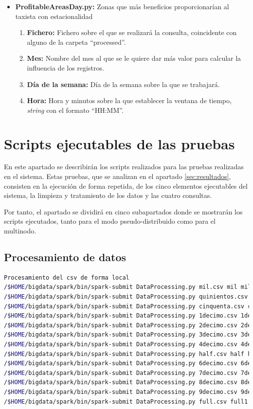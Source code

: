 \begin{itemize}
\item \textbf{ProfitableAreasDay.py:} Zonas que más beneficios proporcionarían al taxista con estacionalidad
\begin{enumerate}
\item \textbf{Fichero:} Fichero sobre el que se realizará la consulta, coincidente con alguno de la carpeta ``processed''.
\item \textbf{Mes:} Nombre del mes al que se le quiere dar más valor para calcular la influencia de los registros.
\item \textbf{Día de la semana:} Día de la semana sobre la que se trabajará.
\item \textbf{Hora:} Hora y minutos sobre la que establecer la ventana de tiempo, \textit{string} con el formato ``HH:MM''.
\end{enumerate}
\end{itemize}

\section{Scripts ejecutables de las pruebas}
En este apartado se describirán los scripts realizados para las pruebas realizadas en el sistema. Estas pruebas, que se analizan en el apartado \ref{sec:resultados}, consisten en la ejecución de forma repetida, de los cinco elementos ejecutables del sistema, la limpieza y tratamiento de los datos y las cuatro consultas.

Por tanto, el apartado se dividirá en cinco subapartados donde se mostrarán los scripts ejecutados, tanto para el modo pseudo-distribuido como para el multinodo.

\subsection{Procesamiento de datos}

\begin{lstlisting}[label=sproc,language=sh,frame=single,caption=Script procesamiento de datos en modo pseudo-distribuido]
 Procesamiento del csv de forma local
/$HOME/bigdata/spark/bin/spark-submit DataProcessing.py mil.csv mil mil
/$HOME/bigdata/spark/bin/spark-submit DataProcessing.py quinientos.csv quinientos quinientos
/$HOME/bigdata/spark/bin/spark-submit DataProcessing.py cinquenta.csv cinquenta cinquenta
/$HOME/bigdata/spark/bin/spark-submit DataProcessing.py 1decimo.csv 1decimo 1decimo
/$HOME/bigdata/spark/bin/spark-submit DataProcessing.py 2decimo.csv 2decimo 2decimo
/$HOME/bigdata/spark/bin/spark-submit DataProcessing.py 3decimo.csv 3decimo 3decimo
/$HOME/bigdata/spark/bin/spark-submit DataProcessing.py 4decimo.csv 4decimo 4decimo
/$HOME/bigdata/spark/bin/spark-submit DataProcessing.py half.csv half half
/$HOME/bigdata/spark/bin/spark-submit DataProcessing.py 6decimo.csv 6decimo1 6decimo
/$HOME/bigdata/spark/bin/spark-submit DataProcessing.py 7decimo.csv 7decimo1 7decimo
/$HOME/bigdata/spark/bin/spark-submit DataProcessing.py 8decimo.csv 8decimo1 8decimo
/$HOME/bigdata/spark/bin/spark-submit DataProcessing.py 9decimo.csv 9decimo1 9decimo
/$HOME/bigdata/spark/bin/spark-submit DataProcessing.py full.csv full1 full
\end{lstlisting}


